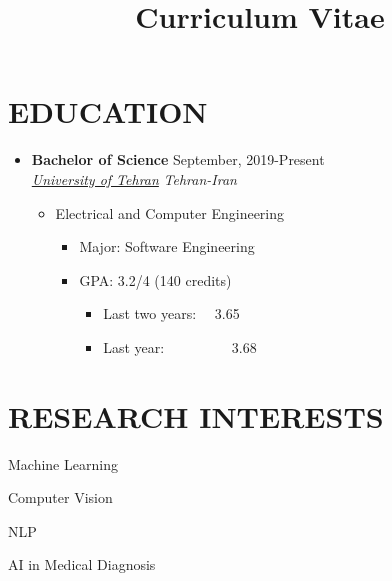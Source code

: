 \documentclass[11pt,a4paper,sans]{moderncv} %
\title{Curriculum Vitae}
\newcommand*{\authorimg}[1]{%
	\raisebox{-.25\baselineskip}{%
		\texttt{[image: \#1]}%
	}%
}
\begin{document}
\makecvtitle
\vspace*{-5mm}  %

\section{EDUCATION}
    \begin{itemize}
        \item \textbf{Bachelor of Science} \hfill September, 2019-Present \\
    	\href{https://ut.ac.ir/fa/}{\authorimg{Images/TehranUni.jpg} \emph{University of Tehran}} \hfill \emph{Tehran-Iran}
    		
    	\begin{itemize}
    		\item Electrical and Computer Engineering
    		\begin{itemize}		
    			\item Major: Software Engineering \hspace{10 pt} 
    			\item GPA: 3.2/4  (140 credits)
            \begin{itemize}
                \item Last two years: ~~3.65
                \item Last year:~~~~~~~~~ 3.68
            \end{itemize}
    		\end{itemize}
    	\end{itemize}
    \end{itemize}


\section{RESEARCH INTERESTS}
        \begin{itemize}
            \begin{multicols}{2}
                \item Machine Learning 
		    \item Computer Vision
		    \item NLP
                \item AI in Medical Diagnosis

            \end{multicols}
	\end{itemize}
\end{document}

